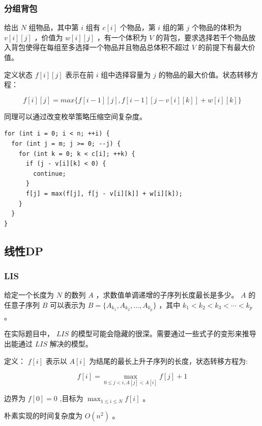 \documentclass[11pt]{article}
\begin{document}
\subsubsection{分组背包}
\label{sec-2-2-4}

给出 $N$ 组物品，其中第 $i$ 组有 $c[i]$ 个物品，第 $i$ 组的第 $j$ 个物品的体积为 $v[i][j]$ ，价值为 $w[i][j]$ ，有一个体积为 $V$ 的背包，要求选择若干个物品放入背包使得在每组至多选择一个物品并且物品总体积不超过 $V$ 的前提下有最大价值。

定义状态 $f[i][j]$ 表示在前 $i$ 组中选择容量为 $j$ 的物品的最大价值。状态转移方程：

$$
f[i][j]=max\{f[i-1][j],f[i-1][j-v[i][k]]+w[i][k]\}
$$

同理可以通过改变枚举策略压缩空间复杂度。

\begin{verbatim}
for (int i = 0; i < n; ++i) {
  for (int j = m; j >= 0; --j) {
    for (int k = 0; k < c[i]; ++k) {
      if (j - v[i][k] < 0) {
        continue;
      }
      f[j] = max(f[j], f[j - v[i][k]] + w[i][k]);
    }
  }
}
\end{verbatim}

\subsection{线性DP}
\label{sec-2-3}
\subsubsection{LIS}
\label{sec-2-3-1}

给定一个长度为 $N$ 的数列 $A$ ，求数值单调递增的子序列长度最长是多少。 $A$ 的任意子序列 $B$ 可以表示为 $B=\{A_{k_1},A_{k_2},...,A_{k_p}\}$ ，其中 $k_1 < k_2 < k_3 < \cdots < k_p$ 。

在实际题目中， $LIS$ 的模型可能会隐藏的很深。需要通过一些式子的变形来推导出能通过 $LIS$ 解决的模型。

定义： $f[i]$ 表示以 $A[i]$ 为结尾的最长上升子序列的长度，状态转移方程为:

$$
f[i]= \max_{0 \leq j < i,A[j] < A[i]} {f[j]+1}
$$

边界为 $f[0]=0$ ,目标为 $\max_{1 \leq i \leq N} {f[i]}$ 。

朴素实现的时间复杂度为 $O(n^2)$ 。
\end{document}
